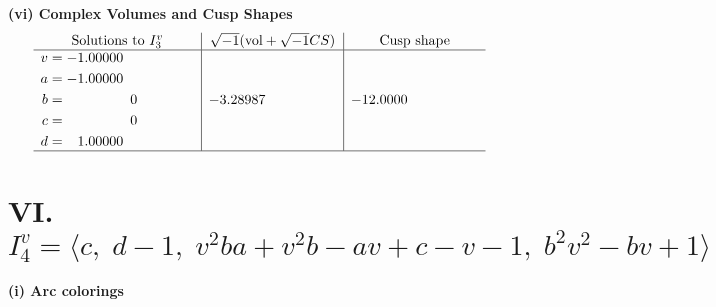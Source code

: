 \documentclass[1p]{elsarticle_modified}
\theoremstyle{definition}
\newcommand{\I}{\sqrt{-1}}
\begin{document}
\newpage\flushleft \textbf{(vi) Complex Volumes and Cusp Shapes}
$$\begin{array}{c|c|c}  
\text{Solutions to }I^v_{3}& \I (\text{vol} + \sqrt{-1}CS) & \text{Cusp shape}\\
 \hline 
\begin{aligned}
v &= -1.00000\phantom{ +0.000000I} \\
a &= -1.00000\phantom{ +0.000000I} \\
b &= \phantom{-0.000000 } 0 \\
c &= \phantom{-0.000000 } 0 \\
d &= \phantom{-}1.00000\phantom{ +0.000000I}\end{aligned}
 & -3.28987\phantom{ +0.000000I} & -12.0000\phantom{ +0.000000I}\\
 \hline 
 \end{array}$$\newpage\newpage\renewcommand{\arraystretch}{1}
\centering \section*{VI. $I^v_{4}= \langle c,\;d-1,\;v^2 b a+v^2 b- a v+c- v-1,\;b^2 v^2- b v+1 \rangle$}
\flushleft \textbf{(i) Arc colorings}\\
\end{document}
